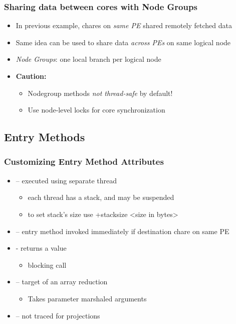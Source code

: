 \begin{frame}[fragile]
  \frametitle{Sharing data between cores with Node Groups}
  \begin{itemize}
    \item In previous example, chares on {\em same PE} shared remotely fetched data
    \item Same idea can be used to share data {\em across PEs} on same logical node
    \item {\em Node Groups}: one local branch per logical node
    \item {\bf Caution:}
    \begin{itemize}
      \item Nodegroup methods {\em not thread-safe} by default! 
      \item Use node-level locks for core synchronization
    \end{itemize}
  \end{itemize}
\end{frame}

\subsection[Entry Methods]{Entry Methods}
\begin{frame}[fragile]
  \frametitle{Customizing Entry Method Attributes}
  \begin{itemize}
    \item {} – executed using separate thread
    \begin{itemize}
      \item each thread has a stack, and may be suspended
      \item to set stack’s size use +stacksize <size in bytes> 
    \end{itemize}
    \item {} – entry method invoked immediately if destination chare on same PE
    \item {} - returns a value
    \begin{itemize}
      \item blocking call
    \end{itemize}
    \item {} – target of an array reduction
    \begin{itemize}
      \item Takes parameter marshaled arguments
    \end{itemize}
    \item {} – not traced for projections
  \end{itemize}
\end{frame}

